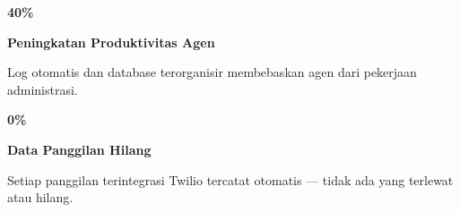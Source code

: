 \documentclass[a4paper]{article}
\begin{document}
\noindent
\begin{minipage}[t]{0.485\textwidth}
    \noindent\colorbox{BlueBg}{%
        \begin{minipage}[t]{\dimexpr\linewidth-2\fboxsep}
            \vspace{6pt}
            {\fontsize{20}{24}\selectfont\bfseries\color{CrimsonPrimary} 40\%}\par\vspace{2pt}
            {\fontsize{9.5}{12}\selectfont\bfseries\color{BlueDark} Peningkatan Produktivitas Agen}\par\vspace{2pt}
            {\fontsize{8.5}{11}\selectfont\color{TextDark}Log otomatis dan database terorganisir membebaskan agen dari pekerjaan administrasi.}%
            \vspace{6pt}
        \end{minipage}}%
    \vspace{6pt}
    \noindent\colorbox{BlueBg}{%
        \begin{minipage}[t]{\dimexpr\linewidth-2\fboxsep}
            \vspace{6pt}
            {\fontsize{20}{24}\selectfont\bfseries\color{CrimsonPrimary} 0\%}\par\vspace{2pt}
            {\fontsize{9.5}{12}\selectfont\bfseries\color{BlueDark} Data Panggilan Hilang}\par\vspace{2pt}
            {\fontsize{8.5}{11}\selectfont\color{TextDark}Setiap panggilan terintegrasi Twilio tercatat otomatis --- tidak ada yang terlewat atau hilang.}%
            \vspace{6pt}
        \end{minipage}}%
\end{minipage}%
\hfill
\end{document}
